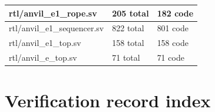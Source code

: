 \documentclass[11pt,a4paper]{article}
\begin{document}
{\begin{longtable}{@{}L{0.55\textwidth}|L{0.18\textwidth}|L{0.18\textwidth}@{}}
rtl/\allowbreak{}anvil\_\allowbreak{}e1\_\allowbreak{}rope.sv & 205 total & 182 code\\[2pt]\hline

rtl/\allowbreak{}anvil\_\allowbreak{}e1\_\allowbreak{}sequencer.sv & 822 total & 801 code\\[2pt]\hline

rtl/\allowbreak{}anvil\_\allowbreak{}e1\_\allowbreak{}top.sv & 158 total & 158 code\\[2pt]\hline

rtl/\allowbreak{}anvil\_\allowbreak{}e\_\allowbreak{}top.sv & 71 total & 71 code\\[2pt]\hline

\bottomrule\end{longtable}}

\section{Verification record index}
\end{document}
